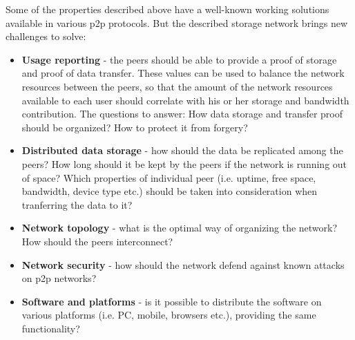 Some of the properties described above have a well-known working solutions
available in various p2p protocols. But the described storage network brings
new challenges to solve:

\begin{itemize}
\item \textbf{Usage reporting} - the peers should be able to provide
  a proof of storage and proof of data transfer. These values can be used
  to balance the network resources between the peers, so that the amount
  of the network resources available to each user should correlate with
  his or her storage and bandwidth contribution. The questions to answer:
  How data storage and transfer proof should be organized? How to protect
  it from forgery?

\item \textbf{Distributed data storage} - how should the data be replicated
  among the peers? How long should it be kept by the peers if the network
  is running out of space? Which properties of individual peer (i.e. uptime,
  free space, bandwidth, device type etc.) should be  taken into consideration
  when tranferring the data to it?

\item \textbf{Network topology} - what is the optimal way of organizing the
  network? How should the peers interconnect?

\item \textbf{Network security} - how should the network defend against known
  attacks on p2p networks?

\item \textbf{Software and platforms} - is it possible to distribute the software
  on various platforms (i.e. PC, mobile, browsers etc.), providing the same
  functionality?
\end{itemize}

